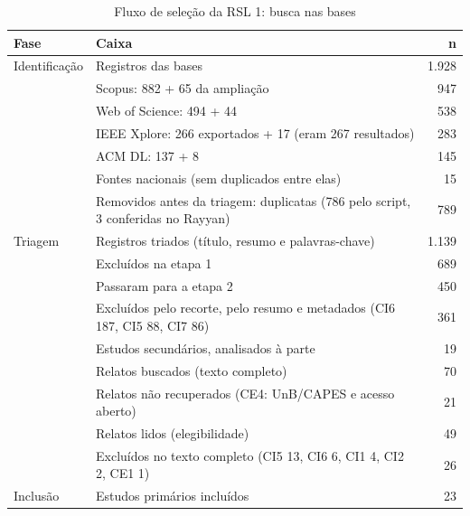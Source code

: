 \begin{table}[htbp]
\centering
\caption{Fluxo de seleção da RSL 1: busca nas bases}
\label{tab:prisma-rsl1}
\small
\begin{tabular}{p{2.2cm}p{9.5cm}r}
\hline
\textbf{Fase} & \textbf{Caixa} & \textbf{n} \\
\hline
Identificação & Registros das bases & 1.928 \\
 & Scopus: 882 + 65 da ampliação & 947 \\
 & Web of Science: 494 + 44 & 538 \\
 & IEEE Xplore: 266 exportados + 17 (eram 267 resultados) & 283 \\
 & ACM DL: 137 + 8 & 145 \\
 & Fontes nacionais (sem duplicados entre elas) & 15 \\
 & Removidos antes da triagem: duplicatas (786 pelo script, 3 conferidas no Rayyan) & 789 \\
Triagem & Registros triados (título, resumo e palavras-chave) & 1.139 \\
 & Excluídos na etapa 1 & 689 \\
 & Passaram para a etapa 2 & 450 \\
 & Excluídos pelo recorte, pelo resumo e metadados (CI6 187, CI5 88, CI7 86) & 361 \\
 & Estudos secundários, analisados à parte & 19 \\
 & Relatos buscados (texto completo) & 70 \\
 & Relatos não recuperados (CE4: UnB/CAPES e acesso aberto) & 21 \\
 & Relatos lidos (elegibilidade) & 49 \\
 & Excluídos no texto completo (CI5 13, CI6 6, CI1 4, CI2 2, CE1 1) & 26 \\
Inclusão & Estudos primários incluídos & 23 \\
\hline
\end{tabular}
\end{table}

